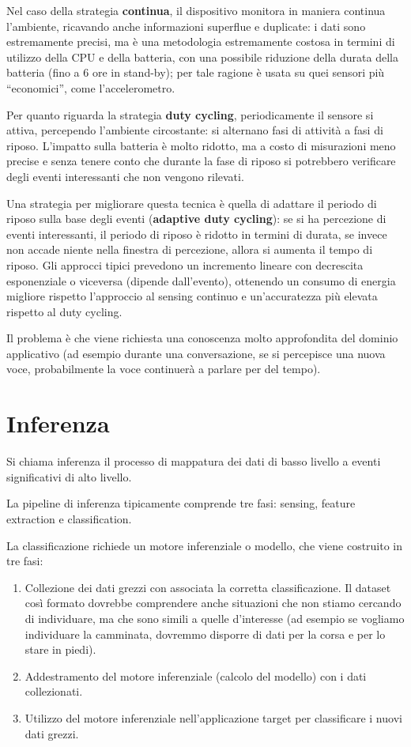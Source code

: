 Nel caso della strategia \textbf{continua}, il dispositivo monitora in maniera
continua l'ambiente, ricavando anche informazioni superflue e duplicate: i dati
sono estremamente precisi, ma è
una metodologia estremamente costosa in termini di utilizzo della CPU e della
batteria, con una possibile riduzione della durata della batteria (fino a 6 ore
in stand-by); per tale ragione è usata su quei sensori più ``economici'', come
l'accelerometro.

Per quanto riguarda la strategia \textbf{duty cycling}, periodicamente il
sensore si
attiva, percependo l'ambiente circostante: si alternano fasi di attività a fasi
di riposo.
L'impatto sulla batteria è molto ridotto, ma a costo di misurazioni
meno precise e senza tenere conto che durante la fase di riposo si potrebbero
verificare degli eventi interessanti che non vengono rilevati.

Una strategia per migliorare questa tecnica è quella di adattare il periodo di
riposo sulla base degli eventi (\textbf{adaptive duty cycling}): se si ha
percezione di eventi interessanti, il periodo di riposo è ridotto in termini di
durata, se invece non accade niente
nella finestra di percezione, allora si aumenta il tempo di riposo.
Gli approcci tipici prevedono un incremento lineare con decrescita
esponenziale o viceversa (dipende dall'evento), ottenendo un consumo di energia
migliore rispetto l'approccio al sensing continuo e un'accuratezza più elevata
rispetto al duty
cycling.

Il problema è che viene richiesta una conoscenza molto approfondita del dominio
applicativo (ad esempio durante una conversazione, se si percepisce una nuova
voce, probabilmente la voce continuerà a parlare per del tempo).

\section{Inferenza}

Si chiama inferenza il processo di mappatura dei dati di basso livello a eventi
significativi di alto livello.

La pipeline di inferenza tipicamente comprende tre fasi: sensing, feature
extraction e classification.

La classificazione richiede un motore inferenziale o modello, che viene
costruito in tre fasi:
\begin{enumerate}
\item Collezione dei dati grezzi con associata la corretta classificazione. Il
dataset così formato dovrebbe comprendere anche situazioni che non stiamo
cercando di individuare, ma che sono simili a quelle d'interesse (ad esempio se
vogliamo individuare la camminata, dovremmo disporre di dati per la corsa e per
lo stare in piedi).
\item Addestramento del motore inferenziale (calcolo del modello) con i dati
collezionati.
\item Utilizzo del motore inferenziale nell'applicazione target per classificare
i nuovi dati grezzi.
\end{enumerate}

